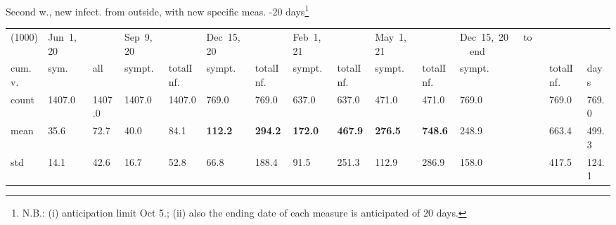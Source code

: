 \documentclass[8pt]{beamer}
\begin{document}
\begin{frame}{Second w., new infect. from outside, with new specific meas. -20 days\footnote{N.B.: (i) anticipation limit Oct 5.; (ii) also the ending date of each measure is anticipated of 20 days.}}
\begin{table}[H]
\center
\tiny
\begin{tabular}{p{0.4cm}p{0.3cm}p{0.3cm}p{0.3cm}p{0.3cm}p{0.3cm}p{0.3cm}p{0.3cm}p{0.3cm}p{0.3cm}p{0.3cm}p{0.3cm}p{0.3cm}p{0.4cm}}
\toprule
(1000) &  Jun~1,~20 & &  Sep~9,~20 & & Dec~15,~20 & & Feb~1,~21 & & May~1,~21 & & Dec~15,~20~~~to~~~end   \\
cum.~v. &  sym. &  all &  sympt. &  totalInf. &  sympt. &  totalInf. &  sympt. &  totalInf. &  sympt. &  totalInf. &  sympt. &  totalInf.  & days\\
\midrule
count &   1407.0 &                     1407.0 &   1407.0 &                     1407.0 &    769.0 &                      769.0 &    637.0 &                      637.0 &    471.0 &                      471.0 &              769.0 &                   769.0 &  769.0 \\
mean  &     35.6 &                       72.7 &     40.0 &                       84.1 &    \textbf{{\color{red}112.2}} &                     \textbf{{\color{red} 294.2}} &    \textbf{172.0} &                      \textbf{467.9} &    \textbf{276.5} &                      \textbf{748.6} &              248.9 &                   663.4 &  499.3 \\
std   &     14.1 &                       42.6 &     16.7 &                       52.8 &     66.8 &                      188.4 &     91.5 &                      251.3 &    112.9 &                      286.9 &               158.0 &                   417.5 &  124.1 \\
\bottomrule
\end{tabular}

\label{selForceWave2Contr2M-20Tab}
\end{table}


\end{frame}
\end{document}
